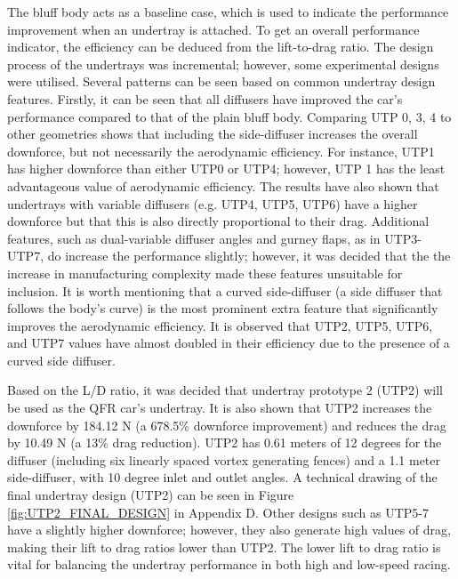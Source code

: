 \noindent The bluff body acts as a baseline case, which is used to indicate the performance improvement when an undertray is attached. To get an overall performance indicator, the efficiency can be deduced from the lift-to-drag ratio. The design process of the undertrays was incremental; however, some experimental designs were utilised. Several patterns can be seen based on common undertray design features. Firstly, it can be seen that all diffusers have improved the car's performance compared to that of the plain bluff body. Comparing UTP 0, 3, 4 to other geometries shows that including the side-diffuser increases the overall downforce, but not necessarily the aerodynamic efficiency. For instance, UTP1 has higher downforce than either UTP0 or UTP4; however, UTP 1 has the least advantageous value of aerodynamic efficiency. The results have also shown that undertrays with variable diffusers (e.g. UTP4, UTP5, UTP6) have a higher downforce but that this is also directly proportional to their drag. Additional features, such as dual-variable diffuser angles and gurney flaps, as in UTP3-UTP7, do increase the performance slightly; however, it was decided that the the increase in manufacturing complexity made these features unsuitable for inclusion. It is worth mentioning that a curved side-diffuser (a side diffuser that follows the body's curve) is the most prominent extra feature that significantly improves the aerodynamic efficiency. It is observed that UTP2, UTP5, UTP6, and UTP7 values have almost doubled in their efficiency due to the presence of a curved side diffuser.

\noindent Based on the L/D ratio, it was decided that undertray prototype 2 (UTP2) will be used as the QFR car's undertray. It is also shown that UTP2 increases the downforce by 184.12 N (a 678.5\% downforce improvement) and reduces the drag by 10.49 N (a 13\% drag reduction). UTP2 has 0.61 meters of 12 degrees for the diffuser (including six linearly spaced vortex generating fences) and a 1.1 meter side-diffuser, with 10 degree inlet and outlet angles. A technical drawing of the final undertray design (UTP2) can be seen in Figure \ref{fig:UTP2_FINAL_DESIGN} in Appendix D. Other designs such as UTP5-7  have a slightly higher downforce; however, they also generate high values of drag, making their lift to drag ratios lower than UTP2. The lower lift to drag ratio is vital for balancing the undertray performance in both high and low-speed racing.

